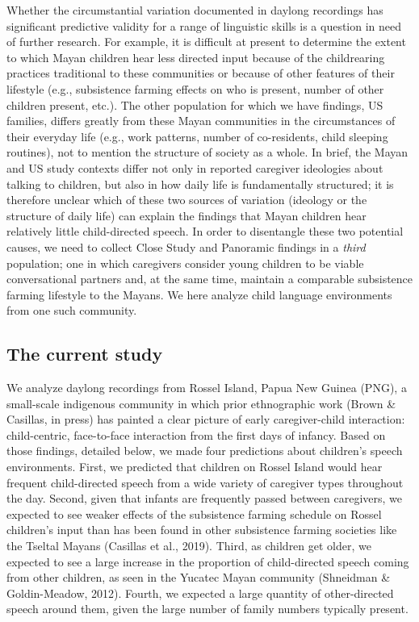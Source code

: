 \documentclass[,man,floatsintext]{apa6}
\begin{document}
Whether the circumstantial variation documented in daylong recordings
has significant predictive validity for a range of linguistic skills is
a question in need of further research. For example, it is difficult at
present to determine the extent to which Mayan children hear less
directed input because of the childrearing practices traditional to
these communities or because of other features of their lifestyle (e.g.,
subsistence farming effects on who is present, number of other children
present, etc.). The other population for which we have findings, US
families, differs greatly from these Mayan communities in the
circumstances of their everyday life (e.g., work patterns, number of
co-residents, child sleeping routines), not to mention the structure of
society as a whole. In brief, the Mayan and US study contexts differ not
only in reported caregiver ideologies about talking to children, but
also in how daily life is fundamentally structured; it is therefore
unclear which of these two sources of variation (ideology or the
structure of daily life) can explain the findings that Mayan children
hear relatively little child-directed speech. In order to disentangle
these two potential causes, we need to collect Close Study and Panoramic
findings in a \emph{third} population; one in which caregivers consider
young children to be viable conversational partners and, at the same
time, maintain a comparable subsistence farming lifestyle to the Mayans.
We here analyze child language environments from one such community.

\subsection{The current study}\label{the-current-study}

We analyze daylong recordings from Rossel Island, Papua New Guinea
(PNG), a small-scale indigenous community in which prior ethnographic
work (Brown \& Casillas, in press) has painted a clear picture of early
caregiver-child interaction: child-centric, face-to-face interaction
from the first days of infancy. Based on those findings, detailed below,
we made four predictions about children's speech environments. First, we
predicted that children on Rossel Island would hear frequent
child-directed speech from a wide variety of caregiver types throughout
the day. Second, given that infants are frequently passed between
caregivers, we expected to see weaker effects of the subsistence farming
schedule on Rossel children's input than has been found in other
subsistence farming societies like the Tseltal Mayans (Casillas et al.,
2019). Third, as children get older, we expected to see a large increase
in the proportion of child-directed speech coming from other children,
as seen in the Yucatec Mayan community (Shneidman \& Goldin-Meadow,
2012). Fourth, we expected a large quantity of other-directed speech
around them, given the large number of family numbers typically present.
\end{document}

